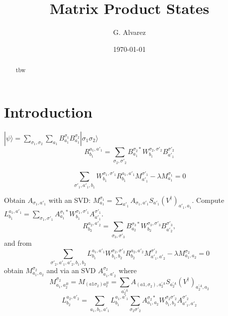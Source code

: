 \documentclass[showpacs,preprintnumbers,amsmath,amssymb,superscriptaddress,showkeys,pre]{revtex4}
\begin{document}
\title{Matrix Product States}

\author{G. Alvarez}

\date{\today}%

\begin{abstract}
tbw
\end{abstract}

\maketitle

\section{\label{sec:intro}Introduction}
$|\psi\rangle=\sum_{\sigma_1,\sigma_2} \sum_{a_1} B^{\sigma_1}_{a_1} B^{\sigma_2}_{a_1}|\sigma_1\sigma_2\rangle$
\begin{equation}
R_{b_1}^{a_1,a'_1} =  \sum_{\sigma_2,\sigma'_2} B^{\sigma_2 *}_{a_1}
W^{\sigma_2,\sigma'_{2}}_{b_1} B^{\sigma'_2}_{a'_1}
\end{equation}

\begin{equation}
\sum_{\sigma'_1,a'_1,b_1} W^{\sigma_1,\sigma'_1}_{b_1} R_{b_1}^{a_1,a'_1} M^{\sigma'_1}_{a'_1} - \lambda M^{\sigma_1}_{a_1}=0
\end{equation}

Obtain $A_{\sigma_1,a'_1}$ with an SVD: $M^{\sigma_1}_{a_1} = \sum_{a'_1} A_{\sigma_1,a'_1} S_{a'_1} (V^\dagger)_{a'_1,a_1}$.
Compute $L^{a_1,a'_1}_{b_1} = \sum_{\sigma_1,\sigma'_1} A^{\sigma_1 *}_{a_1} W^{\sigma_1,\sigma'_1}_{b_1} A^{\sigma'_1}_{a'_1}$.
\begin{equation}
R_{b_2}^{a_2,a'_2} =  \sum_{\sigma_3,\sigma'_3} B^{\sigma_3 *}_{a_2}
W^{\sigma_3,\sigma'_3}_{b_2} B^{\sigma'_3}_{a'_2},
\end{equation}
and from
\begin{equation}
\sum_{\sigma'_2,a'_1,a'_2,b_1,b_2} L^{a_1,a'_1}_{b_1} W^{\sigma_2,\sigma'_2}_{b_1,b_2} R_{b_2}^{a_2,a'_2} M^{\sigma'_2}_{a'_1,a'_2} - \lambda M^{\sigma_2}_{a_1,a_2}=0
\end{equation}
obtain $M^{\sigma_2}_{a_1,a_2}$ and via an SVD $A^{\sigma_2}_{a_1,a'_2}$ where
 \begin{equation}
M^{\sigma_2}_{a_1,a^B_2}=M_{(a1\sigma_2)a^B_2}=\sum_{a^{'A}_2} A_{(a1,\sigma_2),a^{'A}_2} S_{a^{'A}_2}(V^\dagger)_{a^{'A}_2,a_2}
\end{equation}
\begin{equation}
L^{a_2,a'_2}_{b_2} = \sum_{a_1,b_1,a'_1} L^{a_1,a'_1}_{b_1} \sum_{\sigma_2\sigma'_2} A^{\sigma_2 *}_{a_1,a_2} W^{\sigma_2\sigma'_2}_{b_1,b_2}A^{\sigma'_2}_{a'_1,a'_2}
\end{equation}
\end{document}
